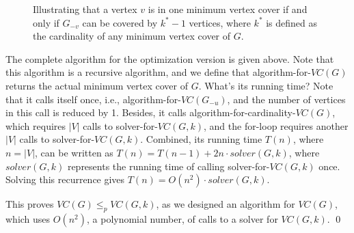 \begin{figure}[h]
\centering{}
\caption{Illustrating that a vertex $v$ is in one minimum vertex cover if and only if
$G_{-v}$ can be covered by $k^* - 1$ vertices, where $k^*$ is defined as the cardinality of any minimum vertex cover of $G$.}
\label{fig:vertex-cover}
\end{figure}


\begin{minipage}{0.8\textwidth}
	\xxx
	\xxx
	\xxx
	\xxx
	\xxx
	\xxx
	\xxx
	\xxx
	\xxx
	\xxx
\end{minipage}

The complete algorithm for the optimization version is given above.
Note that this algorithm is a recursive algorithm, and we define
that algorithm-for-$VC(G)$ returns the actual minimum vertex cover of $G$.
What's its running time? Note that it calls itself once, i.e., 
algorithm-for-$VC(G_{-u})$, and the number of vertices in this call
is reduced by 1. Besides, it calls algorithm-for-cardinality-$VC(G)$,
which requires $|V|$ calls to solver-for-$VC(G, k)$,
and the for-loop requires another $|V|$ calls to solver-for-$VC(G, k)$.
Combined, its running time $T(n)$, where $n = |V|$, can be written
as $T(n) = T(n-1) + 2n\cdot solver(G,k)$, where $solver(G,k)$ represents
the running time of calling solver-for-$VC(G, k)$ once.
Solving this recurrence gives $T(n) = O(n^2)\cdot solver(G,k)$.

This proves $VC(G) \le_p VC(G,k)$, as we designed an algorithm
for $VC(G)$, which uses $O(n^2)$, a polynomial number, of calls
to a solver for $VC(G, k)$. \qed

